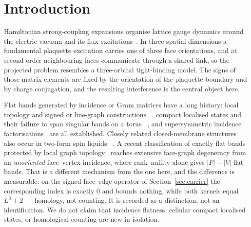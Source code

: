 \documentclass[11pt]{article}
\theoremstyle{plain}
\theoremstyle{definition}
\theoremstyle{remark}
\newcommand{\chk}[1]{}
\begin{document}
\begin{abstract}
For comparison we solve the spectrum of a defined unsigned-incidence operator
in closed form. Identifying that operator with the complete charge-even linked
Hamiltonian requires a further derivation, because the vacuum-mediated route
must be accounted for. The organized upstream corpus records a cold exact
replay of the retained $SU(3)$ third-order chain, although that microscopic
replay is not bundled here. Fourth-order physical-kernel diagnostics remain
conditional; in particular, the retained checkpoints provably do not determine
the off-axis coefficient.
The exact coefficient results are finite-volume and finite-order. In addition,
for $SU(3)$ the periodic-boundary version explicitly permitted by a published
spectral-localisation theorem gives a volume-uniform, nonperturbative
finite-volume Riesz island
for the complete neutral charge-odd
shell at sufficiently small local coupling; the threshold is existential and
the result remains at fixed lattice spacing. No continuum glueball or
Yang--Mills mass-gap claim is made.
\end{abstract}

\section{Introduction}

Hamiltonian strong-coupling expansions organise lattice gauge dynamics around
the electric vacuum and its flux excitations~\cite{KS1975,KSS1976}. In three
spatial dimensions a fundamental plaquette excitation carries one of three face
orientations, and at second order neighbouring faces communicate through a
shared link, so the projected problem resembles a three-orbital tight-binding
model. The signs of those matrix elements are fixed by the orientation of the
plaquette boundary and by charge conjugation, and the resulting interference is
the central object here.

Flat bands generated by incidence or Gram matrices have a long history: local
topology and signed or line-graph constructions
~\cite{Eckmann1944,Sutherland1986,Mielke1991,Zaslavsky2010,Kollar2020},
compact localised states and their failure to span singular bands on a torus
~\cite{Bergman2008,RhimYang2019}, and supersymmetric incidence
factorisations~\cite{Roychowdhury2024} are all established. Closely related
closed-membrane structures also occur in two-form spin liquids
~\cite{ChungGingras2025}. A recent
classification of exactly flat bands protected by local graph
topology~\cite{Hazra2026} reaches extensive face-graph degeneracy from an
\emph{unoriented} face--vertex incidence, where rank--nullity alone gives
$|F|-|V|$ flat bands. That is a different mechanism from the one here, and the
difference is measurable: on the signed face--edge operator of
Section~\ref{sec:carrier} the corresponding index is exactly $0$ and bounds
nothing, while both kernels equal $L^3+2$ --- homology, not counting. It is
recorded as a distinction, not an identification. We do not claim that
incidence flatness, cellular compact localised states, or homological counting
are new in isolation.
\chk{the discrete index theorem gives 0 on the signed face-edge operator, bounding nothing}
\end{document}

